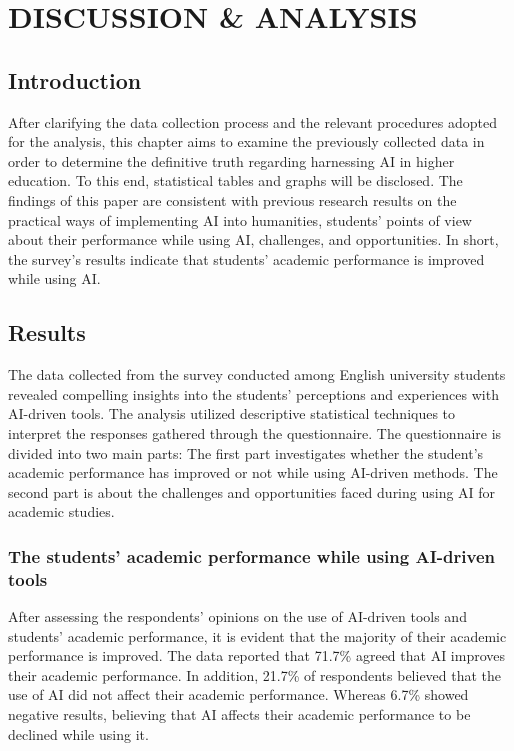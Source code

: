 \chapter{DISCUSSION \& ANALYSIS}
\section{Introduction}
After clarifying the data collection process and the relevant
procedures adopted for the analysis, this chapter aims to
examine the previously collected data in order to
determine the definitive truth regarding harnessing
AI in higher education. To this end, statistical
tables and graphs will be disclosed. The findings
of this paper are consistent with previous research
results on the practical ways of implementing AI
into humanities, students’ points of view about
their performance while using AI, challenges,
and opportunities. In short, the survey’s results
indicate that students’ academic performance is improved while using AI.
\section{Results}
The data collected from the survey conducted among English university
students revealed compelling insights into the students' perceptions
and experiences with AI-driven tools. The analysis utilized descriptive
statistical techniques to interpret the responses gathered through
the questionnaire. The questionnaire is divided into two main parts:
The first part investigates whether the student's academic performance
has improved or not while using AI-driven methods. The second part is
about the challenges and opportunities faced during using AI for academic studies.
\subsection{The students' academic performance while using AI-driven tools}

\begin{figure}[h]
	\centering
\end{figure}

After assessing the respondents' opinions on the use of AI-driven tools and students'
academic performance, it is evident that the majority of their academic performance is improved.
The data reported that 71.7\% agreed that AI improves their academic performance.
In addition, 21.7\% of respondents believed that the use of AI did not affect their
academic performance. Whereas 6.7\% showed negative results, believing
that AI affects their academic performance to be declined while using it.
